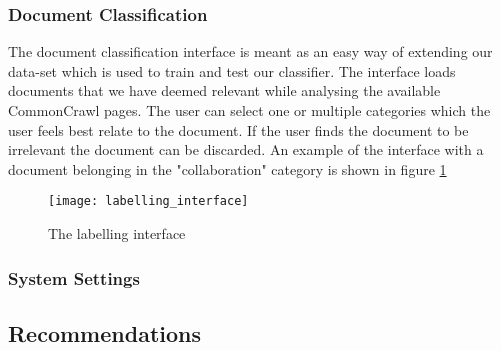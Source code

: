 \subsubsection{Document Classification}
The document classification interface is meant as an easy way of extending our data-set which is used to train and test our classifier. The interface loads documents that we have deemed relevant while analysing the available CommonCrawl pages. The user can select one or multiple categories which the user feels best relate to the document. If the user finds the document to be irrelevant the document can be discarded. An example of the interface with a document belonging in the "collaboration" category is shown in figure \ref{fig:frontend-label}

\begin{figure}[H]
\centering
\texttt{[image: labelling\_interface]}
\caption{The labelling interface}
\label{fig:frontend-label}
\end{figure}

\subsubsection{System Settings}



\subsection{Recommendations}